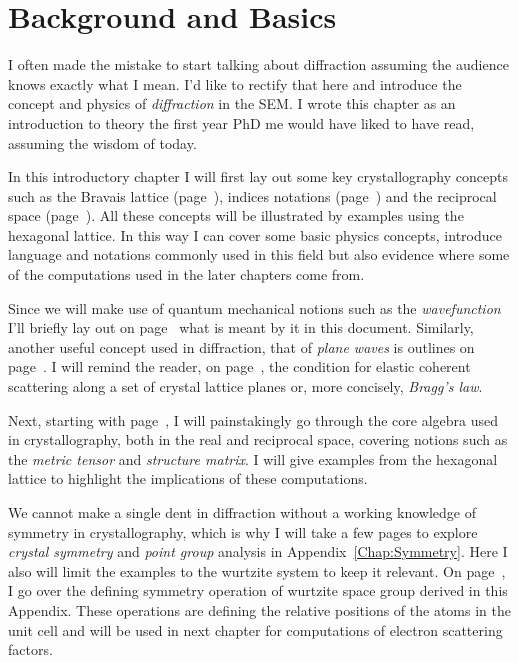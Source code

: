 \chapter{Background and Basics} %
\label{chap:Background} 
I often made the mistake to start talking about diffraction assuming the audience knows exactly what I mean. I'd like to rectify that here and introduce the concept and physics of \textit{diffraction} in the SEM. I wrote this chapter as an introduction to theory the first year PhD me would have liked to have read, assuming the wisdom of today. 

In this introductory chapter I will first lay out some key crystallography concepts such as the Bravais lattice (page~\pageref{Sect:spaceLattice}), indices notations (page~\pageref{subChap:MB indices}) and the reciprocal space (page~\pageref{sec:recMB}). All these concepts will be illustrated by examples using the hexagonal lattice. In this way I can cover some basic physics concepts, introduce language and notations commonly used in this field but also evidence where some of the computations used in the later chapters come from. 

Since we will make use of quantum mechanical notions such as the \textit{wavefunction} I'll briefly lay out on page~\pageref{sec:wave} what is meant by it in this document. Similarly, another useful concept used in diffraction, that of \textit{plane waves} is outlines on page~\pageref{Fig:planeWaves}. 
I will remind the reader, on page~\pageref{Sec:Bragg},  the condition for  elastic coherent scattering along a set of crystal lattice planes or, more concisely, \textit{Bragg's law}. 


Next, starting with page~\pageref{chap:real+recAlg}, I will painstakingly go through the core algebra used in crystallography, both in the real and reciprocal space, covering notions such as the \textit{metric tensor} and \textit{structure matrix}. I will give examples from the hexagonal lattice to highlight the implications of these computations. 


We cannot make a single dent in diffraction without a working knowledge of symmetry in crystallography, which is why I will take a few pages to explore \textit{crystal symmetry} and \textit{point group} analysis in Appendix~\ref{Chap:Symmetry}. Here I also will limit the examples to the wurtzite system to keep it relevant. On page~\pageref{sec:Wsymmetry}, I go over the defining symmetry operation of wurtzite space group derived in this Appendix. These operations are defining the relative positions of the atoms in the unit cell and  will be used in next chapter for computations of electron scattering factors.  



